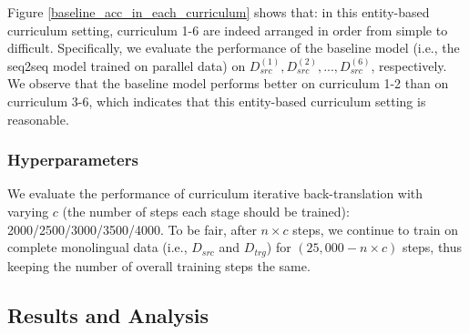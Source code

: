 \documentclass[letterpaper]{article} %
\begin{document}

Figure \ref{baseline_acc_in_each_curriculum} shows that: in this entity-based curriculum setting, curriculum 1-6 are indeed arranged in order from simple to difficult.
Specifically, we evaluate the performance of the baseline model (i.e., the seq2seq model trained on parallel data) on $D_{src}^{(1)}, D_{src}^{(2)}, ..., D_{src}^{(6)}$, respectively.
We observe that the baseline model performs better on curriculum 1-2 than on curriculum 3-6, which indicates that this entity-based curriculum setting is reasonable.

\subsubsection{Hyperparameters}
We evaluate the performance of curriculum iterative back-translation with varying $c$ (the number of steps each stage should be trained): 2000/2500/3000/3500/4000.
To be fair, after $n\times c$ steps, we continue to train on complete monolingual data (i.e., $D_{src}$ and $D_{trg}$) for $(25,000-n\times c)$ steps, thus keeping the number of overall training steps the same.

\subsection{Results and Analysis}
\end{document}
